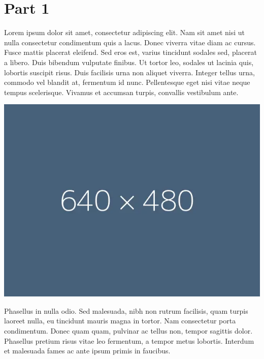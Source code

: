 \section{Part 1}

Lorem ipsum dolor sit amet, consectetur adipiscing elit. Nam sit amet nisi ut nulla consectetur condimentum quis a lacus. 
Donec viverra vitae diam ac cursus. Fusce mattis placerat eleifend. Sed eros est, varius tincidunt sodales sed, placerat a libero. 
Duis bibendum vulputate finibus. Ut tortor leo, sodales ut lacinia quis, lobortis suscipit risus. Duis facilisis urna non aliquet viverra. 
Integer tellus urna, commodo vel blandit at, fermentum id nunc. Pellentesque eget nisi vitae neque tempus scelerisque. 
Vivamus et accumsan turpis, convallis vestibulum ante.\\
\vspace{.5em}

\begin{center}
  \includegraphics[scale=0.5]{graphics/640x480.png}\\
\end{center}
\vspace{.5em}

Phasellus in nulla odio. Sed malesuada, nibh non rutrum facilisis, quam turpis laoreet nulla, eu tincidunt mauris magna in tortor. 
Nam consectetur porta condimentum. Donec quam quam, pulvinar ac tellus non, tempor sagittis dolor. 
Phasellus pretium risus vitae leo fermentum, a tempor metus lobortis. Interdum et malesuada fames ac ante ipsum primis in faucibus. 
